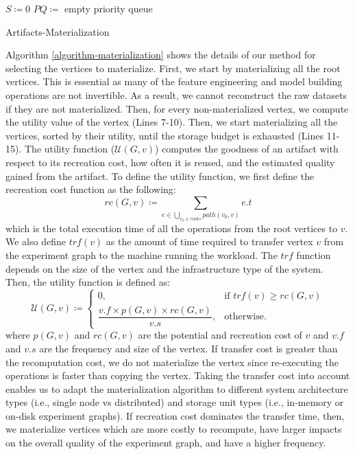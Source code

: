 \begin{algorithm}[h]
$S \coloneqq 0$
 {
}
$PQ \coloneqq $ empty priority queue\;

\caption{Artifacts-Materialization}\label{algorithm-materialization}
\end{algorithm}

Algorithm \ref{algorithm-materialization} shows the details of our method for selecting the vertices to materialize.
First, we start by materializing all the root vertices.
This is essential as many of the feature engineering and model building operations are not invertible.
As a result, we cannot reconstruct the raw datasets if they are not materialized.
Then, for every non-materialized vertex, we compute the utility value of the vertex (Lines 7-10).
Then, we start materializing all the vertices, sorted by their utility, until the storage budget is exhausted (Lines 11-15).
The utility function ($\mathcal{U}(G,v) $) computes the goodness of an artifact with respect to its recreation cost, how often it is reused, and the estimated quality gained from the artifact.
To define the utility function, we first define the recreation cost function as the following:  
\[
rc(G,v) \coloneqq \sum\limits_{e \in \bigcup\limits_{v_{0}\in roots} path(v_{0}, v)} e.t
\]
which is the total execution time of all the operations from the root vertices to $v$.
We also define $trf(v)$ as the amount of time required to transfer vertex $v$ from the experiment graph to the machine running the workload.
The $trf$ function depends on the size of the vertex and the infrastructure type of the system.
Then, the utility function is defined as: 
\[
\mathcal{U}(G,v) \coloneqq  	
		\begin{cases}
		0, & \text{if }  trf(v) \ge rc(G,v)  \\ 
		\dfrac{v.f \times p(G, v) \times rc(G,v)}{v.s}, & \text{otherwise}.
		\end{cases}
\]
where $p(G, v)$ and $rc(G,v)$ are the potential and recreation cost of $v$ and $v.f$ and $v.s$ are the frequency and size of the vertex.
If transfer cost is greater than the recomputation cost, we do not materialize the vertex since re-executing the operations is faster than copying the vertex.
Taking the transfer cost into account enables us to adapt the materialization algorithm to different system architecture types (i.e., single node vs distributed) and storage unit types (i.e., in-memory or on-disk experiment graphs).
If recreation cost dominates the transfer time, then, we materialize vertices which are more costly to recompute, have larger impacts on the overall quality of the experiment graph, and have a higher frequency.

